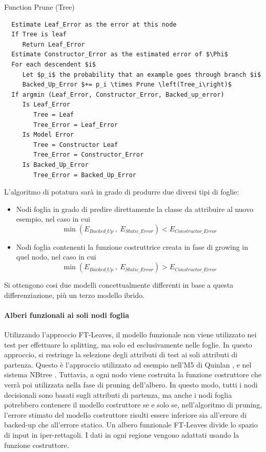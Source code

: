 \begin{algorithm}
	\caption{Function Prune (Tree)}
	\begin{lstlisting}
  Estimate Leaf_Error as the error at this node
  If Tree is leaf 
     Return Leaf_Error
  Estimate Constructor_Error as the estimated error of $\Phi$
  For each descendent $i$
     Let $p_i$ the probability that an example goes through branch $i$
     Backed_Up_Error $+= p_i \times Prune \left(Tree_i\right)$
  If argmin (Leaf_Error, Constructor_Error, Backed_up_error)
     Is Leaf_Error
        Tree = Leaf
        Tree_Error = Leaf_Error
     Is Model Error
        Tree = Constructor Leaf
        Tree_Error = Constructor_Error
     Is Backed_Up_Error
        Tree_Error = Backed_Up_Error
	\end{lstlisting}
\end{algorithm}
L'algoritmo di potatura sarà in grado di produrre due diversi tipi di foglie: 
\begin{itemize}
	\item Nodi foglia in grado di predire direttamente la classe da attribuire al nuovo esempio, nel caso in cui $$\min (E_{Backed\_Up}~,~E_{Static\_Error}) < E_{Constructor\_Error}$$	
	\item Nodi foglia contenenti la funzione costruttrice creata in fase di growing in quel nodo, nel caso in cui
	$$\min (E_{Backed\_Up}~,~E_{Static\_Error}) > E_{Constructor\_Error}$$
\end{itemize}
Si ottengono cosi due modelli concettualmente differenti in base a questa differenziazione, più un terzo modello ibrido.

\paragraph{Alberi funzionali ai soli nodi foglia}
\label{Alberi funzionali ai soli nodi foglia}
Utilizzando l'approccio FT-Leaves, il modello funzionale non viene utilizzato nei test per effettuare lo splitting, ma solo ed esclusivamente nelle foglie. In questo approccio, si restringe la selezione degli attributi di test ai soli attributi di partenza.
Questo è l'approccio utilizzato ad esempio nell'M5 di Quinlan \cite{DBLP:conf/icml/Quinlan93}, e nel sistema NBtree \cite{Kohavi1996}. 
Tuttavia, a ogni nodo viene costruita la funzione costruttore che verrà poi utilizzata nella fase di pruning dell'albero. In questo modo, tutti i nodi decisionali sono basati sugli attributi di partenza, ma anche i nodi foglia potrebbero contenere il modello costruttore se e solo se, nell'algoritmo di pruning, l'errore stimato del modello costruttore risulti essere inferiore sia all'errore di backed-up che all'errore statico. Un albero funzionale FT-Leaves divide lo spazio di input in iper-rettagoli. I dati in ogni regione vengono adattati usando la funzione costruttore.

